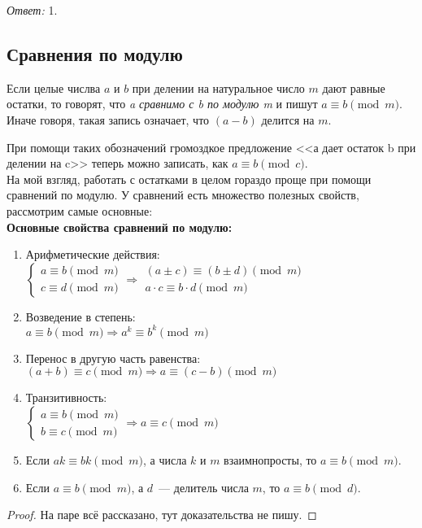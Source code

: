 \documentclass[11pt]{article}
\begin{document}
\textit{Ответ:} 1.

\subsection{Сравнения по модулю}
\begin{definition}
	Если целые числва $a$ и $b$ при делении на натуральное число $m$ дают равные остатки, то говорят, что \emph{a сравнимо с b по модулю m} и пишут $a \equiv b \pmod m$.
Иначе говоря, такая запись означает, что $(a - b)$ делится на $m$.
\end{definition}

При помощи таких обозначений громоздкое предложение <<а дает остаток b при делении на c>> теперь можно записать, как $a \equiv b \pmod c$.\\

На мой взгляд, работать с остатками в целом гораздо проще при помощи сравнений по модулю. У сравнений есть множество полезных свойств, рассмотрим самые основные:\\

\textbf{Основные свойства сравнений по модулю:}
\begin{enumerate}
	\item Арифметические действия:\\
	$\begin{cases}
	a \equiv b \pmod m \\
	c \equiv d \pmod m
	\end{cases} \Longrightarrow \left . \begin{array}{l}(a \pm c) \equiv (b \pm d) \pmod m \\ a \cdot c \equiv b \cdot d \pmod m \end{array} \right .$
	\item Возведение в степень:\\
	$a \equiv b \pmod m \Longrightarrow a^k \equiv b^k \pmod m$
	\item
	Перенос в другую часть равенства:\\
	$(a + b) \equiv c \pmod m \Longrightarrow a \equiv (c - b) \pmod m$
	\item Транзитивность:\\
	$\begin{cases} a \equiv b \pmod m \\ b \equiv c \pmod m\end{cases} \Longrightarrow a \equiv c \pmod m$
	\item Если $ak \equiv bk\pmod{m}$, а числа $k$ и $m$ взаимнопросты, то $a \equiv b \pmod{m}$.
	\item Если $a \equiv b \pmod{m}$, а $d$~--- делитель числа $m$, то $a \equiv b \pmod{d}$.
\end{enumerate}
\begin{proof}

    На паре всё рассказано, тут доказательства не пишу.

\end{proof}
\end{document}
